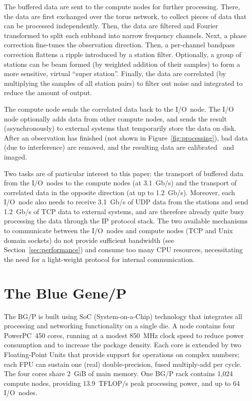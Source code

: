 \documentclass[conference]{worldcomp}
\begin{document}
The buffered data are sent to the compute nodes for further processing.
There, the data are first exchanged over the torus network, to collect pieces
of data that can be processed independently.
Then, the data are filtered and Fourier transformed to split each subband into
narrow frequency channels.
Next, a phase correction fine-tunes the observation direction.
Then, a per-channel bandpass correction flattens a ripple introduced by
a station filter.
Optionally, a group of stations can be beam formed (by weighted addition of
their samples) to form a more sensitive, virtual ``super station''.
Finally, the data are correlated (by multiplying the samples of all station
pairs) to filter out noise and integrated to reduce the amount of output.

The compute node sends the correlated data back to the I/O~node.
The I/O node optionally adds data from other compute nodes, and sends the
result (asynchronously) to external systems that temporarily store the data
on disk.
After an observation has finished (not shown in Figure~\ref{fig:processing}),
bad data (due to interference) are removed, and the
resulting data are calibrated~\cite{Nijboer:07} and imaged.

Two tasks are of particular interest to this paper: the transport of buffered
data from the I/O~nodes to the compute nodes (at 3.1~Gb/s) and the transport
of correlated data in the opposite direction (at up to 1.2~Gb/s).
Moreover, each I/O~node also needs to receive 3.1~Gb/s of UDP data from the
stations and send 1.2~Gb/s of TCP data to external systems, and are therefore
already quite busy processing the data through the IP protocol stack.
The two available mechanisms to communicate between the
I/O~nodes and compute nodes (TCP and Unix domain sockets) do not provide
sufficient bandwidth (see Section~\ref{sec:performance}) and consume
too many CPU resources,
necessitating the need for a light-weight protocol for internal communication.


\section{The Blue Gene/P}
\label{sec:BG/P}



The BG/P is built using SoC (System-on-a-Chip) technology that integrates
all processing and networking functionality on a single die.
A node contains four PowerPC~450 cores, running at a modest 850~MHz clock
speed to reduce power consumption and to increase the package density.
Each core is extended by two Floating-Point Units that provide support for
operations on complex numbers; each FPU can sustain one (real) double-precision,
fused multiply-add per cycle.
The four cores share 2~GiB of main memory.
One BG/P rack contains 1,024 compute nodes, providing 13.9~TFLOP/s peak
processing power, and up to 64 I/O~nodes.
\end{document}
